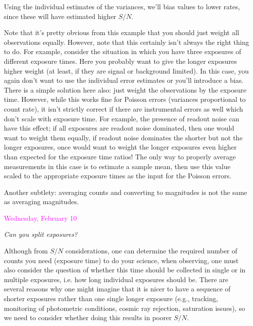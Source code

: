 \documentclass[12pt]{article}
\begin{document}
Using the individual estimates of the variances, we'll bias values to
lower rates, since these will have estimated higher $S/N$.

Note that it's pretty obvious from this example that you should just
weight all observations equally. However, note that this certainly
isn't always the right thing to do. For example, consider the
situation in which you have three exposures of different exposure
times. Here you probably want to give the longer exposures higher
weight (at least, if they are signal or background limited). In this
case, you again don't want to use the individual error estimates or
you'll introduce a bias. There is a simple solution here also: just
weight the observations by the exposure time. However, while this
works fine for Poisson errors (variances proportional to count rate),
it isn't strictly correct if there are instrumental errors as well
which don't scale with exposure time. For example, the presence of
readout noise can have this effect; if all exposures are readout
noise dominated, then one would want to weight them equally, if
readout noise dominates the shorter but not the longer exposures,
once would want to weight the longer exposures even higher than
expected for the exposure time ratios! The only way to properly
average measurements in this case is to estimate a sample mean, then
use this value scaled to the appropriate exposure times as the input
for the Poisson errors.

Another subtlety: averaging counts and converting to magnitudes is
not the same as averaging magnitudes.

\textcolor{om}{\emph{}}

\textcolor{magenta}{Wednesday, February 10}

\emph{Can you split exposures?}

Although from $S/N$ considerations, one can determine the required
number of counts you need (exposure time) to do your science, when
observing, one must also consider the question of whether this time
should be collected in single or in multiple exposures, i.e. how long
individual exposures should be. There are several reasons why one
might imagine that it is nicer to have a sequence of shorter
exposures rather than one single longer exposure (e.g., tracking,
monitoring of photometric conditions, cosmic ray rejection,
saturation issues), so we need to consider whether doing this results
in poorer $S/N$.
\end{document}
